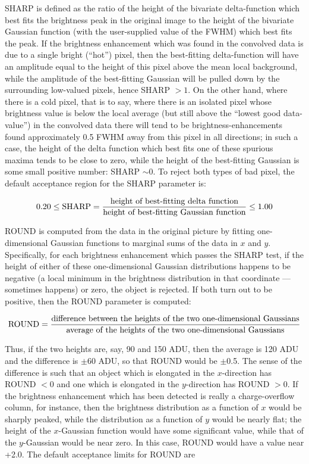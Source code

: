 SHARP is defined as the ratio of the height of the bivariate
delta-function which best fits the brightness peak in the original
image to the height of the bivariate Gaussian function (with the
user-supplied value of the FWHM) which best fits the peak.  If the
brightness enhancement which was found in the convolved data is due to
a single bright (``hot'') pixel, then the best-fitting delta-function
will have an amplitude equal to the height of this pixel above the mean
local background, while the amplitude of the best-fitting Gaussian will
be pulled down by the surrounding low-valued pixels, hence SHARP $>
1$.  On the other hand, where there is a cold pixel, that is to say,
where there is an isolated pixel whose brightness value is below the
local average (but still above the ``lowest good data-value'') in the
convolved data there will tend to be brightness-enhancements found
approximately 0.5 FWHM away from this pixel in all directions; in such
a case, the height of the delta function which best fits one of these
spurious maxima tends to be close to zero, while the height of the
best-fitting Gaussian is some small positive number: SHARP $\sim 0$.
To reject both types of bad pixel, the default acceptance region for
the SHARP parameter is:

$$
0.20 \leq \hbox{\rm SHARP} = {\hbox{\rm height of best-fitting delta function}
\over \hbox{\rm height of best-fitting Gaussian function}} \leq 1.00
$$

ROUND is computed from the data in the original picture by fitting
one-dimensional Gaussian functions to marginal sums of the data in $x$
and $y$. Specifically, for each brightness enhancement which passes the
SHARP test, if the height of either of these one-dimensional Gaussian
distributions happens to be negative (a local minimum in the brightness
distribution in that coordinate --- sometimes happens) or zero, the
object is rejected.  If both turn out to be positive, then the ROUND
parameter is computed:

$$
\hbox{\rm ROUND} = 
{\hbox{\rm difference between the heights of the two one-dimensional Gaussians}
\over
\hbox{\rm average of the heights of the two one-dimensional Gaussians}}
$$

\noindent Thus, if the two heights are, say, 90 and 150 ADU, then the
average is 120 ADU and the difference is $\pm$60 ADU, so that ROUND would
be $\pm$0.5.  The sense of the difference is such that an object which is
elongated in the $x$-direction has ROUND $<0$ and one which is
elongated in the $y$-direction has ROUND $>0$.  If the brightness
enhancement which has been detected is really a charge-overflow column,
for instance, then the brightness distribution as a function of $x$
would be sharply peaked, while the distribution as a function of $y$
would be nearly flat; the height of the $x$-Gaussian function would
have some significant value, while that of the $y$-Gaussian would be
near zero.  In this case, ROUND would have a value near +2.0.  The
default acceptance limits for ROUND are

